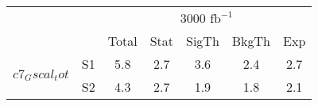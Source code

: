 \begin{tabular}{@{} l c c@{\hskip 0.15in} c c c c @{}}
 \hline
  &  & \multicolumn{5}{c}{3000 $\text{fb}^{-1}$} \\
  &  & Total & Stat & SigTh & BkgTh & Exp \\
 \hline
\multirow{2}{*}{$c7_Gscal_tot$} & S1  & 5.8& 2.7 & 3.6 & 2.4 & 2.7  \\[1pt]
                        & S2  & 4.3& 2.7 & 1.9 & 1.8 & 2.1  \\[4pt]
\hline
\end{tabular}